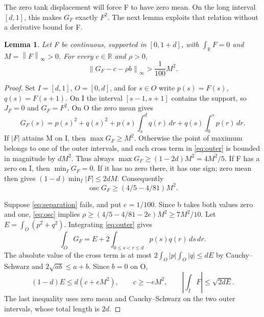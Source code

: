 \documentclass[11pt]{article}
\newtheorem{lemma}[theorem]{Lemma}
\newcommand{\norm}[1]{\left\|#1\right\|}
\begin{document}
The zero tank displacement will force F to have zero mean. On the long
interval $[d,1]$, this makes $G_F$ exactly $F^2$. The next lemma exploits
that relation without a derivative bound for F.

\begin{lemma}\label{lem:separation}
Let F be continuous, supported in $[0,1+d]$, with $\int_{\mathbb R}F=0$ and
$M=\norm{F}_\infty>0$. For every $c\in\mathbb R$ and $\rho>0$,
\begin{equation}\label{eq:separation}
\norm{G_F-c-\rho b}_\infty>\frac1{100}M^2.
\end{equation}
\end{lemma}
\begin{proof}
Set $I=[d,1]$, $O=[0,d]$, and for $s\in O$ write
$p(s)=F(s)$, $q(s)=F(s+1)$. On I the interval $[s-1,s+1]$ contains the
support, so $J_F=0$ and $G_F=F^2$. On O the zero mean gives
\begin{equation}\label{eq:outer}
G_F(s)=p(s)^2+q(s)^2
 +p(s)\int_s^d q(r)\,dr+q(s)\int_0^s p(r)\,dr.
\end{equation}
If $|F|$ attains M on I, then $\max G_F\ge M^2$. Otherwise the point of
maximum belongs to one of the outer intervals, and each cross term in
\eqref{eq:outer} is bounded in magnitude by $dM^2$. Thus always
$\max G_F\ge(1-2d)M^2=4M^2/5$.
If F has a zero on I, then $\min_I G_F=0$. If it has no zero there, it has
one sign; zero mean then gives $(1-d)\min_I|F|\le2dM$. Consequently
\begin{equation}\label{eq:osc}
\operatorname{osc}G_F\ge(4/5-4/81)M^2.
\end{equation}

Suppose \eqref{eq:separation} fails, and put $e=1/100$. Since b takes both
values zero and one, \eqref{eq:osc} implies
$\rho\ge(4/5-4/81-2e)M^2\ge7M^2/10$.
Let $E=\int_O(p^2+q^2)$. Integrating \eqref{eq:outer} gives
\[
\int_O G_F=E+2\int_{0\le s<r\le d}p(s)q(r)\,ds\,dr.
\]
The absolute value of the cross term is at most
$2\int_O|p|\int_O|q|\le dE$ by Cauchy--Schwarz and
$2\sqrt{ab}\le a+b$. Since $b=0$ on O,
\begin{equation}\label{eq:energy}
(1-d)E\le d(c+eM^2),\qquad c\ge-eM^2,\qquad
\left|\int_I F\right|\le\sqrt{2dE}.
\end{equation}
The last inequality uses zero mean and Cauchy--Schwarz on the two outer
intervals, whose total length is $2d$.


\end{proof}
\end{document}
